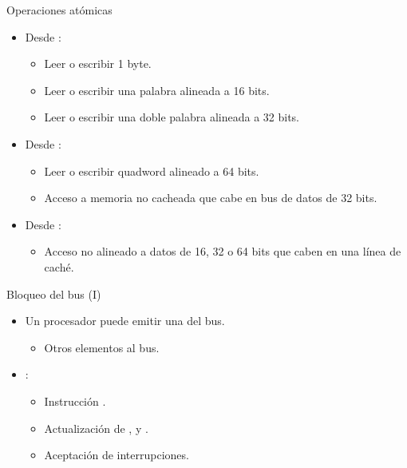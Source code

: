 \begin{frame}[t]{Operaciones atómicas}
\begin{itemize}
  \item Desde :
    \begin{itemize}
      \item Leer o escribir 1 byte.
      \item Leer o escribir una palabra alineada a 16 bits.
      \item Leer o escribir una doble palabra alineada a 32 bits.
    \end{itemize}

  \item Desde :
    \begin{itemize}
      \item Leer o escribir quadword alineado a 64 bits.
      \item Acceso a memoria no cacheada que cabe en bus de datos de 32 bits.
    \end{itemize}

  \item Desde :
    \begin{itemize}
      \item Acceso no alineado a datos de 16, 32 o 64 bits que caben en una línea de caché.
    \end{itemize}
\end{itemize}
\end{frame}

\begin{frame}[t]{Bloqueo del bus (I)}
\begin{itemize}
  \item Un procesador puede emitir una  del bus.
    \begin{itemize}
      \item Otros elementos  al bus.
    \end{itemize}

  \item {}:
    \begin{itemize}
      \item Instrucción .
      \item Actualización de , 
             y 
            .
      \item Aceptación de interrupciones.
    \end{itemize}
\end{itemize}
\end{frame}


